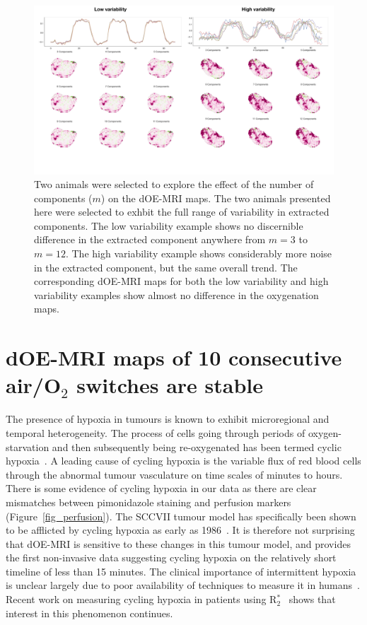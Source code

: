 \begin{figure}[htbp]
   \centering
   \includegraphics[width=\textwidth]{futurework/futurework-images/technical_numComponents.pdf} %
   \caption{Two animals were selected to explore the effect of the number of components ($m$) on the \acs{dOE-MRI} maps. The two animals presented here were selected to exhbit the full range of variability in extracted components. The low variability example shows no discernible difference in the extracted component anywhere from $m=3$ to $m=12$. The high variability example shows considerably more noise in the extracted component, but the same overall trend. The corresponding \acs{dOE-MRI} maps for both the low variability and high variability examples show almost no difference in the oxygenation maps.}
   \label{numComponents}
\end{figure}

\section{dOE-MRI maps of 10 consecutive air/\texorpdfstring{O$_2$}{O2} switches are stable}

The presence of hypoxia in tumours is known to exhibit microregional and temporal heterogeneity.
The process of cells going through periods of oxygen-starvation and then subsequently being re-oxygenated has been termed cyclic hypoxia~\cite{Dewhirst:2009de,Bayer:2011js, Bayer:2012kb}.
A leading cause of cycling hypoxia is the variable flux of red blood cells through the abnormal tumour vasculature on time scales of minutes to hours.
There is some evidence of cycling hypoxia in our data as there are clear mismatches between pimonidazole staining and perfusion markers (Figure~\ref{fig_perfusion}).
The SCCVII tumour model has specifically been shown to be afflicted by cycling hypoxia as early as  1986~\cite{Chaplin:1986iz}.
It is therefore not surprising that \acs{dOE-MRI} is sensitive to these changes in this tumour model, and provides the first non-invasive data suggesting cycling hypoxia on the relatively short timeline of less than 15 minutes.
The clinical importance of intermittent hypoxia is unclear largely due to poor availability of techniques to measure it in humans~\cite{Michiels:2016hv}. 
Recent work on measuring cycling hypoxia in patients using R$_2^*$~\cite{Panek:2017ge} shows that interest in this phenomenon continues.

